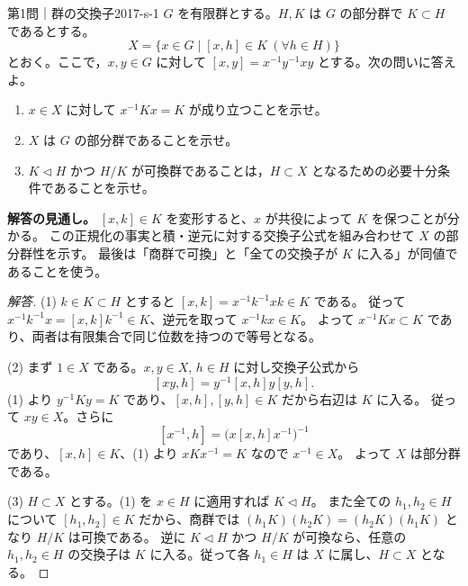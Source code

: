 \begin{problem}{第1問｜群の交換子}{2017-s-1}
$G$ を有限群とする。$H,K$ は $G$ の部分群で $K\subset H$ であるとする。
\[
X=\{x\in G\mid[x,h]\in K\ (\forall h\in H)\}
\]
とおく。ここで，$x,y\in G$ に対して $[x,y]=x^{-1}y^{-1}xy$ とする。次の問いに答えよ。
\begin{enumerate}
  \item[(1)] $x\in X$ に対して $x^{-1}Kx=K$ が成り立つことを示せ。
  \item[(2)] $X$ は $G$ の部分群であることを示せ。
  \item[(3)] $K\triangleleft H$ かつ $H/K$ が可換群であることは，$H\subset X$ となるための必要十分条件であることを示せ。
\end{enumerate}
\end{problem}
\begin{memo*}
\textbf{解答の見通し。}
$[x,k]\in K$ を変形すると、$x$ が共役によって $K$ を保つことが分かる。
この正規化の事実と積・逆元に対する交換子公式を組み合わせて $X$ の部分群性を示す。
最後は「商群で可換」と「全ての交換子が $K$ に入る」が同値であることを使う。
\end{memo*}
\begin{proof}[解答]
(1) $k\in K\subset H$ とすると $[x,k]=x^{-1}k^{-1}xk\in K$ である。
従って $x^{-1}k^{-1}x=[x,k]k^{-1}\in K$、逆元を取って $x^{-1}kx\in K$。
よって $x^{-1}Kx\subset K$ であり、両者は有限集合で同じ位数を持つので等号となる。

(2) まず $1\in X$ である。$x,y\in X$, $h\in H$ に対し交換子公式から
\[
[xy,h]=y^{-1}[x,h]y[y,h].
\]
(1) より $y^{-1}Ky=K$ であり、$[x,h],[y,h]\in K$ だから右辺は $K$ に入る。
従って $xy\in X$。さらに
\[
[x^{-1},h]=\bigl(x[x,h]x^{-1}\bigr)^{-1}
\]
であり、$[x,h]\in K$、(1) より $xKx^{-1}=K$ なので $x^{-1}\in X$。
よって $X$ は部分群である。

(3) $H\subset X$ とする。(1) を $x\in H$ に適用すれば $K\triangleleft H$。
また全ての $h_1,h_2\in H$ について $[h_1,h_2]\in K$ だから、商群では
$(h_1K)(h_2K)=(h_2K)(h_1K)$ となり $H/K$ は可換である。
逆に $K\triangleleft H$ かつ $H/K$ が可換なら、任意の $h_1,h_2\in H$ の交換子は
$K$ に入る。従って各 $h_1\in H$ は $X$ に属し、$H\subset X$ となる。
\end{proof}

